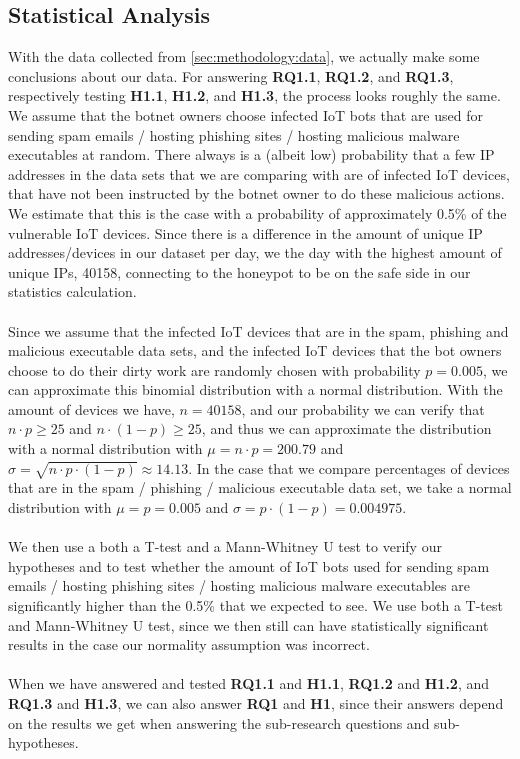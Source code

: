 \documentclass[a4paper,10pt]{article}
\begin{document}
\subsection{Statistical Analysis} \label{sec:methodology:stat_analysis}
With the data collected from \autoref{sec:methodology:data}, we actually make some conclusions about our data.
For answering \textbf{RQ1.1}, \textbf{RQ1.2}, and \textbf{RQ1.3}, respectively testing \textbf{H1.1}, \textbf{H1.2}, 
and \textbf{H1.3}, the process looks roughly the same. We assume that the botnet owners choose infected IoT bots 
that are used for sending spam emails / hosting phishing sites / hosting malicious malware executables at random.
There always is a (albeit low) probability that a few IP addresses in the data sets that we are comparing with are of 
infected IoT devices, that have not been instructed by the botnet owner to do these malicious actions. We estimate 
that this is the case with a probability of approximately 0.5\% of the vulnerable IoT devices. Since there is a difference 
in the amount of unique IP addresses/devices in our dataset per day, we the day with the highest amount of unique 
IPs, 40158, connecting to the honeypot to be on the safe side in our statistics calculation.
\\\\
Since we assume that the infected IoT devices that are in the spam, phishing and malicious executable data sets, 
and the infected IoT devices that the bot owners choose to do their dirty work are randomly chosen with probability
$p = 0.005$, we can approximate this binomial distribution with a normal distribution. With the amount of devices
we have, $n = 40158$, and our probability we can verify that $n \cdot p \geq 25$ and $n \cdot (1-p) \geq 25$, and
thus we can approximate the distribution with a normal distribution with $\mu = n \cdot p = 200.79$ and 
$\sigma = \sqrt{n \cdot p \cdot (1-p)} \approx 14.13$. In the case that we compare percentages of devices that are
in the spam / phishing / malicious executable data set, we take a normal distribution with $\mu = p =0.005$ and 
$\sigma = p \cdot (1-p) = 0.004975$.
\\\\
We then use a both a T-test and a Mann-Whitney U test to verify our hypotheses and to  test whether the amount 
of IoT bots used for sending spam emails / hosting phishing sites / hosting malicious malware executables are 
significantly higher than the 0.5\% that we expected to see. We use both a T-test and Mann-Whitney U test,
since we then still can have statistically significant results in the case our normality assumption was incorrect.
\\\\
When we have answered and tested \textbf{RQ1.1} and \textbf{H1.1}, \textbf{RQ1.2} and \textbf{H1.2}, and 
\textbf{RQ1.3} and \textbf{H1.3}, we can also answer \textbf{RQ1} and \textbf{H1}, since their answers
depend on the results we get when answering the sub-research questions and sub-hypotheses.
\end{document}
